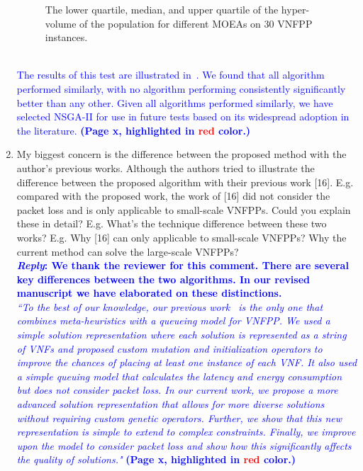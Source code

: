\begin{enumerate}
\begin{figure}[h!]
                  \caption{The lower quartile, median, and upper quartile of the hyper-volume of the population for different MOEAs on 30 VNFPP instances.}
                  \label{fig:moea_comparison}
            \end{figure}\\
            \textcolor{blue}{
                  The results of this test are illustrated in~. We found that all algorithm performed similarly, with no algorithm performing consistently significantly better than any other. Given all algorithms performed similarly, we have selected NSGA-II for use in future tests based on its widespread adoption in the literature.
                  \textbf{(Page x, highlighted in \textcolor{red}{red} color.)} }

      \item\textsf{My biggest concern is the difference between the proposed method with the author’s previous works. Although the authors tried to illustrate the difference between the proposed algorithm with their previous work [16]. E.g. compared with the proposed work, the work of [16] did not consider the packet loss and is only applicable to small-scale VNFPPs. Could you explain these in detail? E.g. What’s the technique difference between these two works? E.g. Why [16] can only applicable to small-scale VNFPPs? Why the current method can solve the large-scale VNFPPs? }\\
            \textcolor{blue}{\textbf{\textit{Reply}: We thank the reviewer for this comment. There are several key differences between the two algorithms. In our revised manuscript we have elaborated on these distinctions.}}\\
            \textcolor{blue}{\textit{``To the best of our knowledge, our previous work~\cite{TODO} is the only one that combines meta-heuristics with a queueing model for VNFPP. We used a simple solution representation where each solution is represented as a string of VNFs and proposed custom mutation and initialization operators to improve the chances of placing at least one instance of each VNF. It also used a simple queuing model that calculates the latency and energy consumption but does not consider packet loss. In our current work, we propose a more advanced solution representation that allows for more diverse solutions without requiring custom genetic operators. Further, we show that this new representation is simple to extend to complex constraints. Finally, we improve upon the model to consider packet loss and show how this significantly affects the quality of solutions."} \textbf{(Page x, highlighted in \textcolor{red}{red} color.)}}\\


\end{enumerate}
